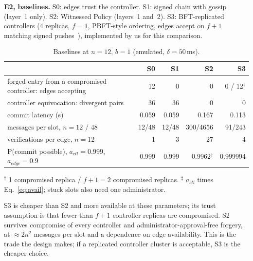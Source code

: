 \documentclass[conference]{IEEEtran}
\begin{document}
\textbf{E2, baselines.} S0: edges trust the controller. S1: signed chain with gossip (layer~1 only). S2: Witnessed Policy (layers~1 and~2). S3: BFT-replicated controllers (4 replicas, $f{=}1$, PBFT-style ordering, edges accept on $f{+}1$ matching signed pushes~\cite{morph}), implemented by us for this comparison.
\begin{table}[t]
\centering\caption{Baselines at $n{=}12$, $b{=}1$ (emulated, $\delta{=}50$\,ms).}\label{tab:base}
\scriptsize
\begin{tabular}{@{}p{2.35cm}rrrr@{}}
\toprule
 & S0 & S1 & S2 & S3\\
\midrule
forged entry from a compromised controller: edges accepting & 12 & 0 & 0 & 0 / 12$^\dagger$\\
controller equivocation: divergent pairs & 36 & 36 & 0 & 0\\
commit latency (s) & 0.059 & 0.059 & 0.167 & 0.113\\
messages per slot, $n{=}12$ / $48$ & 12/48 & 12/48 & 300/4656 & 91/243\\
verifications per edge, $n{=}12$ & 1 & 3 & 27 & 4\\
P(commit possible), $a_{ctl}{=}0.999$, $a_{edge}{=}0.9$ & 0.999 & 0.999 & 0.9962$^\ddagger$ & 0.999994\\
\bottomrule
\end{tabular}

\raggedright\scriptsize $^\dagger$ 1 compromised replica / $f{+}1{=}2$ compromised replicas. $^\ddagger$ $a_{ctl}$ times Eq.~\eqref{eq:avail}; stuck slots also need one administrator.
\end{table}
S3 is cheaper than S2 and more available at these parameters; its trust assumption is that fewer than $f{+}1$ controller replicas are compromised. S2 survives compromise of every controller and administrator-approval-free forgery, at $\approx2n^2$ messages per slot and a dependence on edge availability. This is the trade the design makes; if a replicated controller cluster is acceptable, S3 is the cheaper choice.
\end{document}
